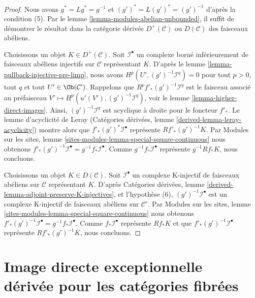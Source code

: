 \begin{proof}
Nous avons $g^* = Lg^* = g^{-1}$ et
$(g')^* = L(g')^* = (g')^{-1}$ d'après la condition (5).
Par le lemme \ref{lemma-modules-abelian-unbounded}, il suffit de démontrer le
résultat dans la catégorie dérivée $D^+(\mathcal{C})$ ou $D(\mathcal{C})$
des faisceaux abéliens.

\medskip\noindent
Choisissons un objet $K \in D^+(\mathcal{C})$. Soit
$\mathcal{I}^\bullet$ un complexe borné inférieurement de faisceaux abéliens
injectifs sur $\mathcal{C}$ représentant $K$. D'après le
lemme \ref{lemma-pullback-injective-pre-limp}, nous avons
$H^p(U', (g')^{-1}\mathcal{I}^q) = 0$ pour tout $p > 0$, tout $q$ et tout
$U' \in \Ob(\mathcal{C}')$. Rappelons que
$R^pf'_*(g')^{-1}\mathcal{I}^q$ est le faisceau associé au préfaisceau
$V' \mapsto H^p(u'(V'), (g')^{-1}\mathcal{I}^q)$, voir le
lemme \ref{lemma-higher-direct-images}. Ainsi,
$(g')^{-1}\mathcal{I}^q$ est acyclique à droite pour le foncteur $f'_*$.
Le lemme d'acyclicité de Leray (Catégories dérivées, lemme
\ref{derived-lemma-leray-acyclicity}) montre alors que
$f'_*(g')^*\mathcal{I}^\bullet$ représente $Rf'_*(g')^{-1}K$.
Par Modules sur les sites, lemme
\ref{sites-modules-lemma-special-square-continuous}
nous obtenons
$f'_*(g')^{-1}\mathcal{I}^\bullet = g^{-1}f_*\mathcal{I}^\bullet$.
Comme $g^{-1}f_*\mathcal{I}^\bullet$ représente $g^{-1}Rf_*K$, nous
concluons.

\medskip\noindent
Choisissons un objet $K \in D(\mathcal{C})$. Soit $\mathcal{I}^\bullet$ un
complexe K-injectif de faisceaux abéliens sur $\mathcal{C}$ représentant
$K$. D'après Catégories dérivées, lemme
\ref{derived-lemma-adjoint-preserve-K-injectives}, et l'hypothèse (6),
$(g')^{-1}\mathcal{I}^\bullet$ est un complexe K-injectif de faisceaux
abéliens sur $\mathcal{C}'$. Par Modules sur les sites, lemme
\ref{sites-modules-lemma-special-square-continuous}
nous obtenons
$f'_*(g')^{-1}\mathcal{I}^\bullet = g^{-1}f_*\mathcal{I}^\bullet$.
Comme $f_*\mathcal{I}^\bullet$ représente $Rf_*K$ et que
$f'_*(g')^{-1}\mathcal{I}^\bullet$ représente $Rf'_*(g')^{-1}K$, nous
concluons.
\end{proof}








\section{Image directe exceptionnelle dérivée pour les catégories fibrées}
\label{section-derived-lower-shriek-fibred}

